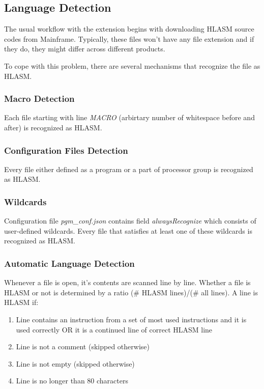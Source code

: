 \subsection{Language Detection}

The usual workflow with the extension begins with downloading HLASM source codes from Mainframe. Typically, these files won't have any file extension and if they do, they might differ across different products.

To cope with this problem, there are several mechanisms that recognize the file as HLASM.

\subsubsection{Macro Detection}

Each file starting with line \emph{MACRO} (arbirtary number of whitespace before and after) is recognized as HLASM.

\subsubsection{Configuration Files Detection}

Every file either defined as a program or a part of processor group is recognized as HLASM.

\subsubsection{Wildcards}

Configuration file \emph{pgm\_conf.json} contains field \emph{alwaysRecognize} which consists of user-defined wildcards. Every file that satisfies at least one of these wildcards is recognized as HLASM.

\subsubsection{Automatic Language Detection}

Whenever a file is open, it's contents are scanned line by line. Whether a file is HLASM or not is determined by a ratio (\# HLASM lines)/(\# all lines). A line is HLASM if:
\begin{enumerate}
	\item Line contains an instruction from a set of most used instructions and it is used correctly OR it is a continued line of correct HLASM line
	\item Line is not a comment (skipped otherwise)
	\item Line is not empty (skipped otherwise)
	\item Line is no longer than 80 characters
\end{enumerate}

